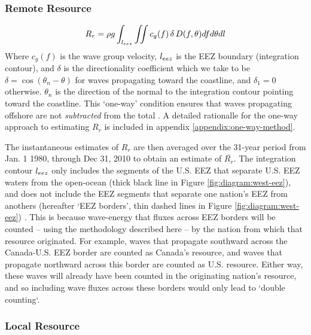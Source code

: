 \subsubsection{Remote Resource} \label{sec:method:calc:remote}

\begin{align}
  R_r = \rho g \int_{l_{eez}}\iint c_g(f) \, \delta \, D(f,\theta) df d\theta dl
\end{align}
Where $c_g(f)$ is the wave group velocity, $l_{eez}$ is the EEZ boundary (integration contour), and $\delta$ is the directionality coefficient which we take to be $\delta = \cos(\theta_n - \theta)$ for waves propagating toward the coastline, and $\delta_1 = 0$ otherwise. $\theta_n$ is the direction of the normal to the integration contour pointing toward the coastline. This `one-way' condition ensures that waves propagating offshore are not {\em subtracted} from the total \citep[]{gunnQuantifyingGlobalWave2012}. A detailed rationalle for the one-way approach to estimating $R_r$ is included in appendix \ref{appendix:one-way-method}.

The instantaneous estimates of $R_r$ are then averaged over the 31-year period from Jan. 1 1980, through Dec 31, 2010 to obtain an estimate of $\overline{R_r}$.
The integration contour $l_{eez}$ only includes the segments of the U.S. EEZ that separate U.S. EEZ waters from the open-ocean (thick black line in Figure \ref{fig:diagram:west-eez}), and does not include the EEZ segments that separate one nation's EEZ from anothers (hereafter `EEZ borders', thin dashed lines in Figure \ref{fig:diagram:west-eez}) \citep[]{flandersmarineinstituteMaritimeBoundariesGeodatabase2018}. This is because wave-energy that fluxes across EEZ borders will be counted -- using the methodology described here -- by the nation from which that resource originated. For example, waves that propagate southward across the Canada-U.S. EEZ border are counted as Canada's resource, and waves that propagate northward across this border are counted as U.S. resource. Either way, these waves will already have been counted in the originating nation's resource, and so including wave fluxes across these borders would only lead to `double counting`.

\subsubsection{Local Resource} \label{sec:method:calc:local}

